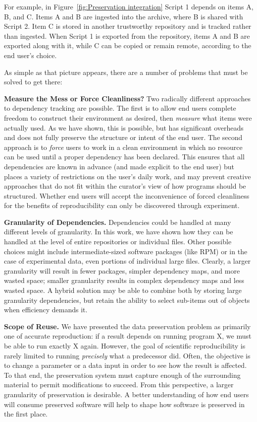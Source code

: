 \documentclass{sig-alternate}
\begin{document}
For example, in Figure~\ref{fig:Preservation integration} Script 1 depends on items A, B, and C.  Items A and B are ingested into the archive, where B is shared with Script 2.  Item C is stored in another trustworthy repository and is tracked rather than ingested.  When Script 1 is exported from the repository, items A and B are exported along with it, while C can be copied or remain remote, according to the end user's choice.

As simple as that picture appears, there are a number of problems that must be solved to get there:

{\bf Measure the Mess or Force Cleanliness?}  Two radically different approaches to dependency tracking are possible.  The first is to allow end users complete freedom to construct their environment as desired, then \emph{measure} what items were actually used.  As we have shown, this is possible, but has significant overheads and does not fully preserve the structure or intent of the end user.   The second approach is to \emph{force} users to work in a clean environment in which no resource can be used until a proper dependency has been declared.  This ensures that all dependencies are known in advance (and made explicit to the end user) but places a variety of restrictions on the user's daily work, and may prevent creative approaches that do not fit within the curator's view of how programs should be structured.  Whether end users will accept the inconvenience of forced cleanliness for the benefits of reproducibility can only be discovered through experiment.

{\bf Granularity of Dependencies.}  Dependencies could be handled
at many different levels of granularity.  In this work, we have shown
how they can be handled at the level of entire repositories or individual files.
Other possible choices might include intermediate-sized software packages
(like RPM) or in the case of experimental data, even portions of individual large files.  Clearly, a larger granularity will result in fewer packages,
simpler dependency maps, and more wasted space; smaller granularity results
in complex dependency maps and less wasted space.  A hybrid solution may
be able to combine both by storing large granularity dependencies, but
retain the ability to select sub-items out of objects when efficiency demands it.

{\bf Scope of Reuse.}  We have presented the data preservation
problem as primarily one of accurate reproduction: if a result depends
on running program X, we must be able to run exactly X again.  However,
the goal of scientific reproducibility is rarely limited to running
\emph{precisely} what a predecessor did. Often, the objective is to
change a parameter or a data input in order to see how the result is affected.
To that end, the preservation system must capture enough of the surrounding
material to permit modifications to succeed.  From this perspective,
a larger granularity of preservation is desirable.  A better understanding of
how end users will consume preserved software will help to shape how
software is preserved in the first place.
\end{document}

